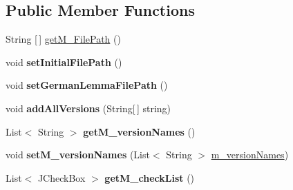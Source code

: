 \subsection*{Public Member Functions}
\begin{DoxyCompactItemize}
\item 
String \mbox{[}$\,$\mbox{]} \hyperlink{classtranslation_visualizaton_g_u_i_1_1_version_chosen_panel_a8b960328c36ce36d4817837bd0843f9c}{get\+M\+\_\+\+File\+Path} ()
\item 
\mbox{\label{classtranslation_visualizaton_g_u_i_1_1_version_chosen_panel_a1a894cf67cc38c7e8ba7a94c432903bf}} 
void {\bfseries set\+Initial\+File\+Path} ()
\item 
\mbox{\label{classtranslation_visualizaton_g_u_i_1_1_version_chosen_panel_a9f46f0beb66850276b0a72df287c2c03}} 
void {\bfseries set\+German\+Lemma\+File\+Path} ()
\item 
\mbox{\label{classtranslation_visualizaton_g_u_i_1_1_version_chosen_panel_a83db8b074f9bdb726ffe7d383a440d2d}} 
void {\bfseries add\+All\+Versions} (String\mbox{[}$\,$\mbox{]} string)
\item 
\mbox{\label{classtranslation_visualizaton_g_u_i_1_1_version_chosen_panel_a2c0bd0472fd45a69755ee270a5cca0a2}} 
List$<$ String $>$ {\bfseries get\+M\+\_\+version\+Names} ()
\item 
\mbox{\label{classtranslation_visualizaton_g_u_i_1_1_version_chosen_panel_aae3a8d811c19be05919c37607c92945f}} 
void {\bfseries set\+M\+\_\+version\+Names} (List$<$ String $>$ \hyperlink{classtranslation_visualizaton_g_u_i_1_1_version_chosen_panel_a886df3a3c3c1d8bd15320d84972fa518}{m\+\_\+version\+Names})
\item 
\mbox{\label{classtranslation_visualizaton_g_u_i_1_1_version_chosen_panel_ae07211a76c075a6ec4eb081a6a5ca810}} 
List$<$ J\+Check\+Box $>$ {\bfseries get\+M\+\_\+check\+List} ()
\item 

\end{DoxyCompactItemize}
